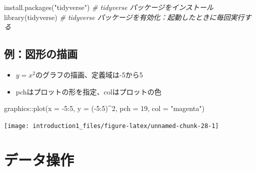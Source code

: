 \documentclass[
]{ltjsarticle}
\newenvironment{Shaded}{\begin{snugshade}}{\end{snugshade}}
\newcommand{\AttributeTok}[1]{\textcolor[rgb]{0.77,0.63,0.00}{#1}}
\newcommand{\CommentTok}[1]{\textcolor[rgb]{0.56,0.35,0.01}{\textit{#1}}}
\newcommand{\DecValTok}[1]{\textcolor[rgb]{0.00,0.00,0.81}{#1}}
\newcommand{\FunctionTok}[1]{\textcolor[rgb]{0.00,0.00,0.00}{#1}}
\newcommand{\NormalTok}[1]{#1}
\newcommand{\SpecialCharTok}[1]{\textcolor[rgb]{0.00,0.00,0.00}{#1}}
\newcommand{\StringTok}[1]{\textcolor[rgb]{0.31,0.60,0.02}{#1}}
\providecommand{\tightlist}{%
  \setlength{\itemsep}{0pt}\setlength{\parskip}{0pt}}
\begin{document}
\begin{Shaded}
\begin{Highlighting}[]
\FunctionTok{install.packages}\NormalTok{(}\StringTok{"tidyverse"}\NormalTok{) }\CommentTok{\# tidyverse パッケージをインストール}
\FunctionTok{library}\NormalTok{(tidyverse) }\CommentTok{\# tidyverse パッケージを有効化：起動したときに毎回実行する}
\end{Highlighting}
\end{Shaded}

\hypertarget{ux4f8bux56f3ux5f62ux306eux63cfux753b}{%
\subsection{例：図形の描画}\label{ux4f8bux56f3ux5f62ux306eux63cfux753b}}

\begin{itemize}
\tightlist
\item
  \(y = x^2\)のグラフの描画、定義域は-5から5
\item
  pchはプロットの形を指定、colはプロットの色
\end{itemize}

\begin{Shaded}
\begin{Highlighting}[]
\NormalTok{graphics}\SpecialCharTok{::}\FunctionTok{plot}\NormalTok{(}\AttributeTok{x =} \SpecialCharTok{{-}}\DecValTok{5}\SpecialCharTok{:}\DecValTok{5}\NormalTok{, }\AttributeTok{y =}\NormalTok{ (}\SpecialCharTok{{-}}\DecValTok{5}\SpecialCharTok{:}\DecValTok{5}\NormalTok{)}\SpecialCharTok{\^{}}\DecValTok{2}\NormalTok{, }\AttributeTok{pch =} \DecValTok{19}\NormalTok{, }\AttributeTok{col =} \StringTok{"magenta"}\NormalTok{) }
\end{Highlighting}
\end{Shaded}

\begin{center}\texttt{[image: introduction1\_files/figure-latex/unnamed-chunk-28-1]} \end{center}

\hypertarget{ux30c7ux30fcux30bfux64cdux4f5c}{%
\section{データ操作}\label{ux30c7ux30fcux30bfux64cdux4f5c}}
\end{document}

